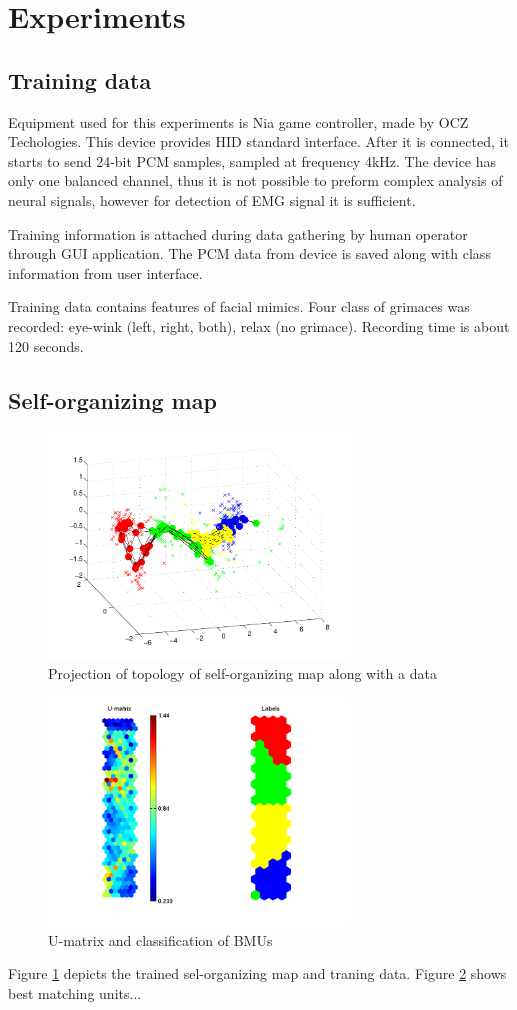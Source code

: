 \documentclass[a4paper]{IEEEtran}
\begin{document}
\section{Experiments}
\subsection{Training data}
Equipment used for this experiments is {Nia game controller}, made by 
{OCZ Techologies}. This device provides HID standard interface.
After it is connected, it starts to send 24-bit PCM samples, 
sampled at frequency 4kHz. The device has only one balanced channel, thus 
it is not possible to preform complex analysis of neural signals,
however for detection of EMG signal it is sufficient.

Training information is attached during data gathering by human operator 
through GUI application.
The PCM data from device is saved along with class information from
user interface.

Training data contains features of facial mimics.
Four class of grimaces was recorded: eye-wink (left, right, both), 
relax (no grimace).
Recording time is about 120 seconds.

\subsection{Self-organizing map}
\begin{figure}[h]
\includegraphics[width=80mm]{som_topol_proj}
\caption{Projection of topology of self-organizing map along with a data}
\label{som_topol_proj}
\end{figure}
\begin{figure}[h]
\includegraphics[width=80mm]{som_umat}
\caption{U-matrix and classification of BMUs}
\label{som_umat}
\end{figure}
Figure \ref{som_topol_proj} depicts the trained sel-organizing map and 
traning data.
Figure \ref{som_umat} shows best matching units...
\end{document}
